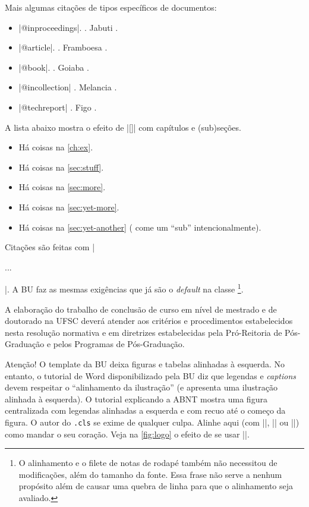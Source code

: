 \documentclass[embeddedlogo]{../ufsc-thesis-rn46-2019}
\begin{document}
Mais algumas citações de tipos específicos de documentos:
\begin{itemize}
\item \mt|@inproceedings|. . Jabuti
  \cite{Ullman1989magic}.
\item \mt|@article|. . Framboesa \cite{Distefano2019}.
\item \mt|@book|. . Goiaba \cite{Abiteboul1995}.
\item \mt|@incollection| . Melancia \cite{Forgy1989}.
\item \mt|@techreport| . Figo \cite{rdf11}.
\end{itemize}

A lista abaixo mostra o efeito de \mt|\autoref{}| com capítulos e (sub)seções.

\begin{itemize}
\item Há coisas na \autoref{ch:ex}.
\item Há coisas na \autoref{sec:stuff}.
\item Há coisas na \autoref{sec:more}.
\item Há coisas na \autoref{sec:yet-more}.
\item Há coisas na \autoref{sec:yet-another} (\abnTeX{} come um ``sub'' intencionalmente). 
\end{itemize}

Citações são feitas com \mt|\begin{citacao}...\end{citacao}|. A BU faz
as mesmas exigências que já são o \textit{default} na classe
\abnTeX\footnote{O alinhamento e o filete de notas de rodapé também
não necessitou de modificações, além do tamanho da fonte. Essa frase
não serve a nenhum propósito além de causar uma quebra de linha para
que o alinhamento seja avaliado.}.

\begin{citacao}
  A elaboração do trabalho de conclusão de curso em nível de mestrado
  e de doutorado na UFSC deverá atender aos critérios e procedimentos
  estabelecidos nesta resolução normativa e em diretrizes
  estabelecidas pela Pró-Reitoria de Pós-Graduação e pelos Programas
  de Pós-Graduação.
\end{citacao}

Atenção! O template da BU deixa figuras e tabelas alinhadas à esquerda. No
entanto, o tutorial de Word disponibilizado pela BU diz que legendas e
\emph{captions} devem respeitar o ``alinhamento da ilustração'' (e apresenta
uma ilustração alinhada à esquerda). O tutorial explicando a ABNT mostra uma
figura centralizada com legendas alinhadas a esquerda e com recuo até o começo
da figura. O autor do \texttt{.cls} se exime de qualquer culpa. Alinhe aqui
(com \mt|\centering|, \mt|\flushright| ou \mt|\flushleft|) como mandar o seu
coração. Veja na \autoref{fig:logo} o efeito de se usar \mt|\centering|.
\end{document}
